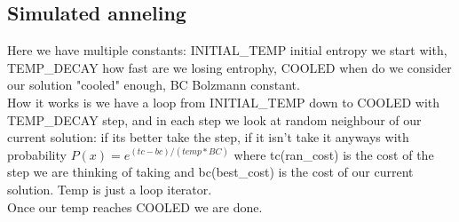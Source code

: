 \documentclass[10pt,a4paper]{article}
\begin{document}
		\subsection{Simulated anneling}
			Here we have multiple constants: INITIAL\_TEMP	initial entropy we start with, TEMP\_DECAY how fast are we losing entrophy, COOLED when do we consider our solution "cooled" enough, BC Bolzmann constant. \\
			How it works is we have a loop from INITIAL\_TEMP down to COOLED with TEMP\_DECAY step, and in each step we look at random neighbour of our current solution: if its better take the step, if it isn't take it anyways with probability $P(x)=e^{(tc-bc)/(temp*BC)}$ where tc(ran\_cost) is the cost of the step we are thinking of taking and bc(best\_cost) is the cost of our current solution. Temp is just a loop iterator.\\
			Once our temp reaches COOLED we are done.
\end{document}
